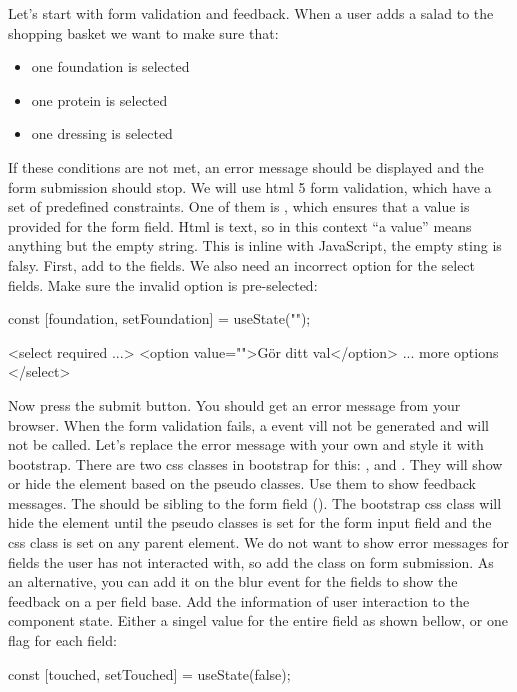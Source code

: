 \documentclass[fleqn, article, a4paper]{memoir}
\begin{document}
\begin{Assignments}

\item Let's start with form validation and feedback. When a user adds a salad to the shopping basket we want to make sure that:
\begin{itemize}
  \item one foundation is selected
  \item one protein is selected
  \item one dressing is selected
\end{itemize}
If these conditions are not met, an error message should be displayed and the form submission should stop. We will use html 5 form validation, which have a set of predefined constraints. One of them is , which ensures that a value is provided for the form field. Html is text, so in this context ``a value'' means anything but the empty string. This is inline with JavaScript, the empty sting is falsy. First, add  to the  fields. We also need an incorrect option for the select fields. Make sure the invalid option is pre-selected:
\begin{Code}
const [foundation, setFoundation] = useState("");

<select required ...>
  <option value="">Gör ditt val</option>
  ... more options
</select>
\end{Code}
Now press the submit button. You should get an error message from your browser. When the form validation fails, a  event vill not be generated and  will not be called. Let's replace the error message with your own and style it with bootstrap. There are two css classes in bootstrap for this: , and . They will show or hide the element based on the  pseudo classes. Use them to show feedback messages. The  should be sibling to the form field (). The bootstrap css class will hide the element until the pseudo classes  is set for the form input field and the css class  is set on any parent element. We do not want to show error messages for fields the user has not interacted with, so add the  class on form submission. As an alternative, you can add it on the blur event for the fields to show the feedback on a per field base.  Add the information of user interaction to the component state. Either a singel value for the entire field as shown bellow, or one flag for each field:
\begin{Code}
const [touched, setTouched] = useState(false);


\end{Code}
\end{Assignments}
\end{document}
